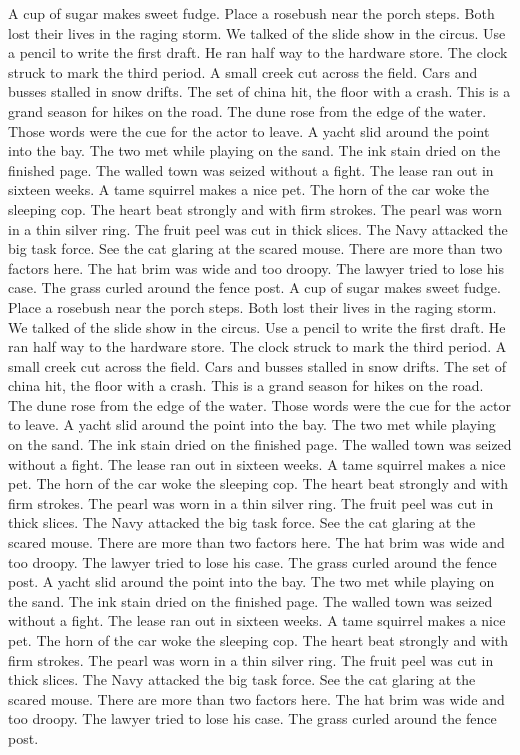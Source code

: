 \documentclass[
  letterpaper,
  DIV=11,
  numbers=noendperiod]{scrartcl}
\begin{document}
A cup of sugar makes sweet fudge. Place a rosebush near the porch steps.
Both lost their lives in the raging storm. We talked of the slide show
in the circus. Use a pencil to write the first draft. He ran half way to
the hardware store. The clock struck to mark the third period. A small
creek cut across the field. Cars and busses stalled in snow drifts. The
set of china hit, the floor with a crash. This is a grand season for
hikes on the road. The dune rose from the edge of the water. Those words
were the cue for the actor to leave. A yacht slid around the point into
the bay. The two met while playing on the sand. The ink stain dried on
the finished page. The walled town was seized without a fight. The lease
ran out in sixteen weeks. A tame squirrel makes a nice pet. The horn of
the car woke the sleeping cop. The heart beat strongly and with firm
strokes. The pearl was worn in a thin silver ring. The fruit peel was
cut in thick slices. The Navy attacked the big task force. See the cat
glaring at the scared mouse. There are more than two factors here. The
hat brim was wide and too droopy. The lawyer tried to lose his case. The
grass curled around the fence post. A cup of sugar makes sweet fudge.
Place a rosebush near the porch steps. Both lost their lives in the
raging storm. We talked of the slide show in the circus. Use a pencil to
write the first draft. He ran half way to the hardware store. The clock
struck to mark the third period. A small creek cut across the field.
Cars and busses stalled in snow drifts. The set of china hit, the floor
with a crash. This is a grand season for hikes on the road. The dune
rose from the edge of the water. Those words were the cue for the actor
to leave. A yacht slid around the point into the bay. The two met while
playing on the sand. The ink stain dried on the finished page. The
walled town was seized without a fight. The lease ran out in sixteen
weeks. A tame squirrel makes a nice pet. The horn of the car woke the
sleeping cop. The heart beat strongly and with firm strokes. The pearl
was worn in a thin silver ring. The fruit peel was cut in thick slices.
The Navy attacked the big task force. See the cat glaring at the scared
mouse. There are more than two factors here. The hat brim was wide and
too droopy. The lawyer tried to lose his case. The grass curled around
the fence post. A yacht slid around the point into the bay. The two met
while playing on the sand. The ink stain dried on the finished page. The
walled town was seized without a fight. The lease ran out in sixteen
weeks. A tame squirrel makes a nice pet. The horn of the car woke the
sleeping cop. The heart beat strongly and with firm strokes. The pearl
was worn in a thin silver ring. The fruit peel was cut in thick slices.
The Navy attacked the big task force. See the cat glaring at the scared
mouse. There are more than two factors here. The hat brim was wide and
too droopy. The lawyer tried to lose his case. The grass curled around
the fence post.
\end{document}
